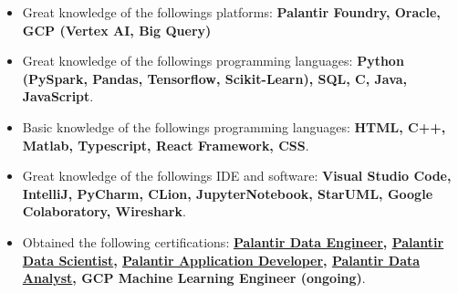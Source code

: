 \documentclass[10pt,a4paper]{altacv}
\begin{document}
\begin{itemize}
  \item Great knowledge of the followings platforms: \textbf{Palantir Foundry, Oracle, GCP (Vertex AI, Big Query)}
  \item Great knowledge of the followings programming languages: \textbf{Python (PySpark, Pandas, Tensorflow, Scikit-Learn), SQL, C, Java, JavaScript}.
  \item Basic knowledge of the followings programming languages: \textbf{HTML, C++, Matlab, Typescript, React Framework, CSS}.
  \item Great knowledge of the followings IDE and software: \textbf{Visual Studio Code, IntelliJ, PyCharm, CLion, JupyterNotebook, StarUML, Google Colaboratory, Wireshark}.
  \item Obtained the following certifications: \textbf{\href{https://verify.skilljar.com/c/w9z3dnmtv68y}{Palantir Data Engineer}, \href{https://verify.skilljar.com/c/gx72n6ke6ybo}{Palantir Data Scientist}, \href{https://verify.skilljar.com/c/42kbrbf6i9cq}{Palantir Application Developer}, \href{https://verify.skilljar.com/c/8po7zjfgt25o}{Palantir Data Analyst}, GCP Machine Learning Engineer (ongoing)}.

  
\end{itemize}



\end{document}
